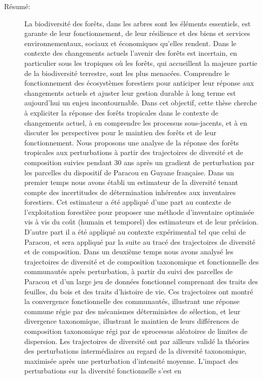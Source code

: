 \documentclass[
  11pt,
  french,
  A4paper,
  extrafontsizes,onecolumn,openright
  ]{memoir}
\begin{document}
\begin{normalsize}
\begin{description}
\item[Résumé:]
La biodiversité des forêts, dans les arbres sont les éléments
essentiels, est garante de leur fonctionnement, de leur résilience et
des biens et services environnementaux, sociaux et économiques qu'elles
rendent. Dans le contexte des changements actuels l'avenir des forêts
est incertain, en particulier sous les tropiques où les forêts, qui
accueillent la majeure partie de la biodiversité terrestre, sont les
plus menacées. Comprendre le fonctionnement des écosystèmes forestiers
pour anticiper leur réponse aux changements actuels et ajuster leur
gestion durable à long terme est aujourd'hui un enjeu incontournable.
Dans cet objectif, cette thèse cherche à expliciter la réponse des
forêts tropicales dans le contexte de changements actuel, à en
comprendre les processus sous-jacents, et à en discuter les perspectives
pour le maintien des forêts et de leur fonctionnement. Nous proposons
une analyse de la réponse des forêts tropicales aux perturbations à
partir des trajectoires de diversité et de composition suivies pendant
30 ans après un gradient de perturbation par les parcelles du dispositif
de Paracou en Guyane française. Dans un premier temps nous avons établi
un estimateur de la diversité tenant compte des incertitudes de
détermination inhérentes aux inventaires forestiers. Cet estimateur a
été appliqué d'une part au contexte de l'exploitation forestière pour
proposer une méthode d'inventaire optimisée vis à vis du coût (humain et
temporel) des estimateurs et de leur précision. D'autre part il a été
appliqué au contexte expérimental tel que celui de Paracou, et sera
appliqué par la suite au tracé des trajectoires de diversité et de
composition. Dans un deuxième temps nous avons analysé les trajectoires
de diversité et de composition taxonomique et fonctionnelle des
communautés après perturbation, à partir du suivi des parcelles de
Paracou et d'un large jeu de données fonctionnel comprenant des traits
des feuilles, du bois et des traits d'histoire de vie. Ces trajectoires
ont montré la convergence fonctionnelle des communautés, illustrant une
réponse commune régie par des mécanismes déterministes de sélection, et
leur divergence taxonomique, illustrant le maintien de leurs différences
de composition taxonomique régi par de sprocessus aléatoires de limites
de dispersion. Les trajectoires de diversité ont par ailleurs validé la
théories des perturbations intermédiaires au regard de la diversité
taxonomique, maximisée après une perturbation d'intensité moyenne.
L'impact des perturbations sur la diversité fonctionnelle s'est en

\end{description}
\end{normalsize}
\end{document}

